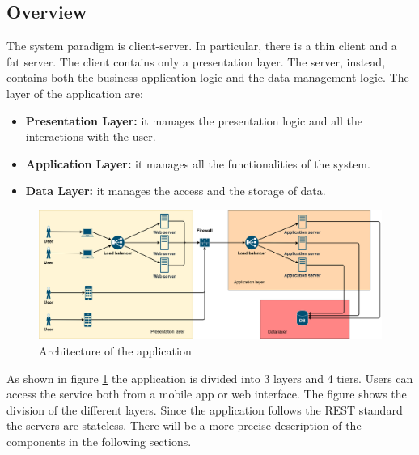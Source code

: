 \subsection{Overview}
The system paradigm is client-server. In particular, there is a thin client and a fat server. 
The client contains only a presentation layer. 
The server, instead, contains both the business application logic and the data management logic. 
The layer of the application are:
\begin{itemize}
    \item \textbf{Presentation Layer:} it manages the presentation logic and all the interactions with the user.
    \item \textbf{Application Layer:} it manages all the functionalities of the system.
    \item \textbf{Data Layer:} it manages the access and the storage of data.
\end{itemize}

\begin{figure}[H]
    \includegraphics[width=\textwidth,height=\textheight,keepaspectratio]{Images/architectureDesignDiagram.png}
    \caption{Architecture of the application}
    \label{fig:architectue_diagram}
\end{figure}

As shown in figure \ref{fig:architectue_diagram} the application is divided into 3 layers and 4 tiers. Users can access the service
both from a mobile app or web interface. The figure shows the division of the different layers. Since the application follows the 
REST standard the servers are stateless. There will be a more precise description of the components in the following sections.

\newpage

